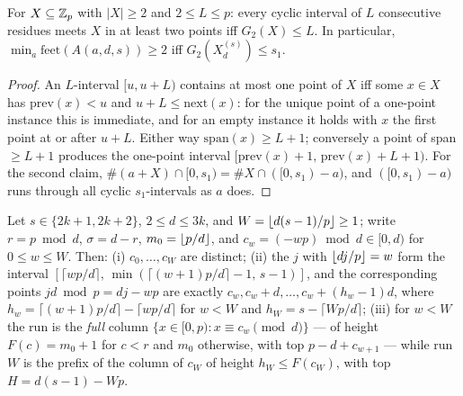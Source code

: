 \begin{lemma}\label{lem:E0}
For $X\subseteq\mathbb{Z}_p$ with $|X|\ge2$ and $2\le L\le p$: every cyclic
interval of $L$ consecutive residues meets $X$ in at least two points
iff $G_2(X)\le L$. In particular,
$\min_a\mathrm{feet}(A(a,d,s))\ge2$ iff $G_2(X^{(s)}_d)\le s_1$.
\end{lemma}

\begin{proof}
An $L$-interval $[u,u+L)$ contains at most one point of $X$ iff some
$x\in X$ has $\mathrm{prev}(x)<u$ and $u+L\le\mathrm{next}(x)$: for the
unique point of a one-point instance this is immediate, and for an empty
instance it holds with $x$ the first point at or after $u+L$. Either
way $\mathrm{span}(x)\ge L+1$; conversely a point of span $\ge L+1$
produces the one-point interval $[\mathrm{prev}(x)+1,\,
\mathrm{prev}(x)+L+1)$. For the second claim,
$\#(a+X)\cap[0,s_1)=\#X\cap([0,s_1)-a)$, and $([0,s_1)-a)$ runs through
all cyclic $s_1$-intervals as $a$ does.
\end{proof}

\begin{lemma}\label{lem:E1}
Let $s\in\{2k{+}1,2k{+}2\}$, $2\le d\le3k$, and
$W=\left\lfloor d(s-1)/p \right\rfloor\ge1$; write $r=p\bmod d$, $\sigma=d-r$,
$m_0=\left\lfloor p/d \right\rfloor$, and $c_w=(-wp)\bmod d\in[0,d)$ for $0\le w\le W$.
Then: \textup{(i)} $c_0,\dots,c_W$ are distinct; \textup{(ii)} the $j$
with $\left\lfloor dj/p \right\rfloor=w$ form the interval
$[\lceil wp/d\rceil,\,\min(\lceil(w{+}1)p/d\rceil-1,\,s-1)]$, and the
corresponding points $jd\bmod p=dj-wp$ are exactly
$c_w,c_w+d,\dots,c_w+(h_w-1)d$, where
$h_w=\lceil(w{+}1)p/d\rceil-\lceil wp/d\rceil$ for $w<W$ and
$h_W=s-\lceil Wp/d\rceil$; \textup{(iii)} for $w<W$ the run is the
\emph{full} column $\{x\in[0,p):x\equiv c_w\pmod d\}$ --- of height
$F(c)=m_0+1$ for $c<r$ and $m_0$ otherwise, with top $p-d+c_{w+1}$ ---
while run $W$ is the prefix of the column of $c_W$ of height
$h_W\le F(c_W)$, with top $H=d(s-1)-Wp$.
\end{lemma}

